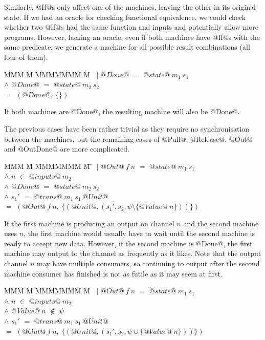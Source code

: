 Similarly, @If@s only affect one of the machines, leaving the other in its original state.
If we had an oracle for checking functional equivalence, we could check whether two @If@s had the same function and inputs and potentially allow more programs.
However, lacking an oracle, even if both machines have @If@s with the same predicate, we generate a machine for all possible result combinations (all four of them).

\begin{tabbing}
MMM \= M \= MMMMMMM \= M \=\kill
 \> $~|$ \> $@Done@$ \> $=$ \> $@state@~m_1~s_1$ \\
 \> $\wedge$ \> $@Done@$ \> $=$ \> $@state@~m_2~s_2$ \\
 \> $=$ \> $(@Done@,~\{\})$ \\
\end{tabbing}

If both machines are @Done@, the resulting machine will also be @Done@.

The previous cases have been rather trivial as they require no synchronisation between the machines, but the remaining cases of @Pull@, @Release@, @Out@ and @OutDone@ are more complicated.

\begin{tabbing}
MMM \= M \= MMMMMMM \= M \=\kill
 \> $~|$ \> $@Out@~f~n$ \> $=$ \> $@state@~m_1~s_1$ \\
 \> $\wedge$ \> $n$      \> $\in$ \> $@inputs@~m_2$ \\
 \> $\wedge$ \> $@Done@$ \> $=$ \> $@state@~m_2~s_2$ \\
 \> $\wedge$ \> $s_1'$     \> $=$ \> $@trans@~m_1~s_1~@Unit@$ \\
 \> $=$ \> $(@Out@~f~n,~\{(@Unit@, (s_1',s_2,\psi \setminus \{@Value@~n\} ))\})$ \\
\end{tabbing}

If the first machine is producing an output on channel $n$ and the second machine uses $n$, the first machine would usually have to wait until the second machine is ready to accept new data.
However, if the second machine is @Done@, the first machine may output to the channel as frequently as it likes.
Note that the output channel $n$ may have multiple consumers, so continuing to output after the second machine consumer has finished is not as futile as it may seem at first.

\begin{tabbing}
MMM \= M \= MMMMMMM \= M \=\kill
 \> $~|$ \> $@Out@~f~n$ \> $=$ \> $@state@~m_1~s_1$ \\
 \> $\wedge$ \> $n$      \> $\in$ \> $@inputs@~m_2$ \\
 \> $\wedge$ \> $@Value@~n$ \> $\not\in$ \> $\psi$ \\
 \> $\wedge$ \> $s_1'$     \> $=$ \> $@trans@~m_1~s_1~@Unit@$ \\
 \> $=$ \> $(@Out@~f~n,~\{(@Unit@, (s_1',s_2,\psi \cup \{@Value@~n\} ))\})$ \\
\end{tabbing}

